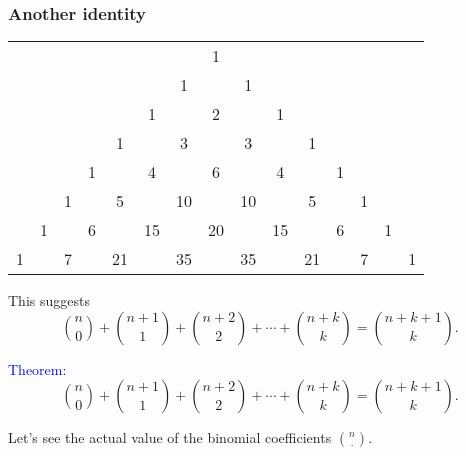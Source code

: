 \begin{frame}\frametitle{Another identity}
  \begin{tcolorbox}
    {\footnotesize
      \begin{tabular}{ccccccccccccccc}
        & & & & & & & 1 & & & & & & & \\
        & & & & & & 1 & & 1 & & & & & & \\
        & & & & & 1 & & 2 & & 1 & & & & & \\
        & & & & 1 & & 3 & & 3 & & 1 & & & & \\
        & & & 1 & & 4 & & 6 & & 4 & & 1 & & & \\
        & & 1 & & 5 & & 10 & & 10 & & 5 & & 1 & & \\
        & 1 & & 6 & & 15 & & 20 & & 15 & & 6 & & 1 & \\
        1 & & 7 & & 21 & & 35 & & 35 & & 21 & & 7 & & 1 \\
      \end{tabular}
    }
  \end{tcolorbox}
  \pause

  This suggests
  \[
  \binom{n}{0} + \binom{n+1}{1} + \binom{n+2}{2} + \cdots + \binom{n+k}{k} = \binom{n+k+1}{k}.
  \]
\end{frame}

\begin{frame}
  \textcolor{blue}{Theorem:}
  \[
  \binom{n}{0} + \binom{n+1}{1} + \binom{n+2}{2} + \cdots + \binom{n+k}{k} = \binom{n+k+1}{k}.
  \]
  \vspace{2.5in}
\end{frame}

\begin{frame}
  Let's see the actual value of the binomial coefficients
  $\binom{n}{\cdot}$. 
\end{frame}
